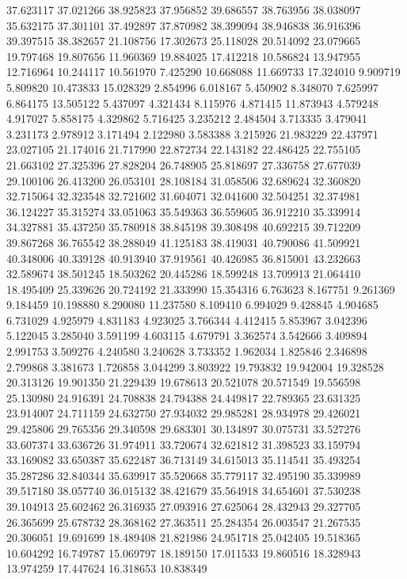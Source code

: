 37.623117
37.021266
38.925823
37.956852
39.686557
38.763956
38.038097
35.632175
37.301101
37.492897
37.870982
38.399094
38.946838
36.916396
39.397515
38.382657
21.108756
17.302673
25.118028
20.514092
23.079665
19.797468
19.807656
11.960369
19.884025
17.412218
10.586824
13.947955
12.716964
10.244117
10.561970
7.425290
10.668088
11.669733
17.324010
9.909719
5.809820
10.473833
15.028329
2.854996
6.018167
5.450902
8.348070
7.625997
6.864175
13.505122
5.437097
4.321434
8.115976
4.871415
11.873943
4.579248
4.917027
5.858175
4.329862
5.716425
3.235212
2.484504
3.713335
3.479041
3.231173
2.978912
3.171494
2.122980
3.583388
3.215926
21.983229
22.437971
23.027105
21.174016
21.717990
22.872734
22.143182
22.486425
22.755105
21.663102
27.325396
27.828204
26.748905
25.818697
27.336758
27.677039
29.100106
26.413200
26.053101
28.108184
31.058506
32.689624
32.360820
32.715064
32.323548
32.721602
31.604071
32.041600
32.504251
32.374981
36.124227
35.315274
33.051063
35.549363
36.559605
36.912210
35.339914
34.327881
35.437250
35.780918
38.845198
39.308498
40.692215
39.712209
39.867268
36.765542
38.288049
41.125183
38.419031
40.790086
41.509921
40.348006
40.339128
40.913940
37.919561
40.426985
36.815001
43.232663
32.589674
38.501245
18.503262
20.445286
18.599248
13.709913
21.064410
18.495409
25.339626
20.724192
21.333990
15.354316
6.763623
8.167751
9.261369
9.184459
10.198880
8.290080
11.237580
8.109410
6.994029
9.428845
4.904685
6.731029
4.925979
4.831183
4.923025
3.766344
4.412415
5.853967
3.042396
5.122045
3.285040
3.591199
4.603115
4.679791
3.362574
3.542666
3.409894
2.991753
3.509276
4.240580
3.240628
3.733352
1.962034
1.825846
2.346898
2.799868
3.381673
1.726858
3.044299
3.803922
19.793832
19.942004
19.328528
20.313126
19.901350
21.229439
19.678613
20.521078
20.571549
19.556598
25.130980
24.916391
24.708838
24.794388
24.449817
22.789365
23.631325
23.914007
24.711159
24.632750
27.934032
29.985281
28.934978
29.426021
29.425806
29.765356
29.340598
29.683301
30.134897
30.075731
33.527276
33.607374
33.636726
31.974911
33.720674
32.621812
31.398523
33.159794
33.169082
33.650387
35.622487
36.713149
34.615013
35.114541
35.493254
35.287286
32.840344
35.639917
35.520668
35.779117
32.495190
35.339989
39.517180
38.057740
36.015132
38.421679
35.564918
34.654601
37.530238
39.104913
25.602462
26.316935
27.093916
27.625064
28.432943
29.327705
26.365699
25.678732
28.368162
27.363511
25.284354
26.003547
21.267535
20.306051
19.691699
18.489408
21.821986
24.951718
25.042405
19.518365
10.604292
16.749787
15.069797
18.189150
17.011533
19.860516
18.328943
13.974259
17.447624
16.318653
10.838349
